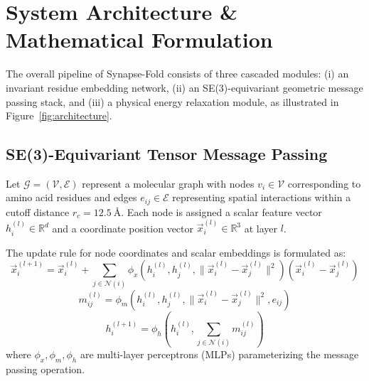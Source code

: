 \documentclass[10pt,a4paper]{scrartcl}
\begin{document}
\section{System Architecture \& Mathematical Formulation}

The overall pipeline of Synapse-Fold consists of three cascaded modules: (i) an invariant residue embedding network, (ii) an SE(3)-equivariant geometric message passing stack, and (iii) a physical energy relaxation module, as illustrated in Figure~\ref{fig:architecture}.


\subsection{SE(3)-Equivariant Tensor Message Passing}

Let $\mathcal{G} = (\mathcal{V}, \mathcal{E})$ represent a molecular graph with nodes $v_i \in \mathcal{V}$ corresponding to amino acid residues and edges $e_{ij} \in \mathcal{E}$ representing spatial interactions within a cutoff distance $r_c = 12.5~\text{\AA}$. Each node is assigned a scalar feature vector $h_i^{(l)} \in \mathbb{R}^d$ and a coordinate position vector $\vec{x}_i^{(l)} \in \mathbb{R}^3$ at layer $l$.

The update rule for node coordinates and scalar embeddings is formulated as:
\begin{equation}
\vec{x}_i^{(l+1)} = \vec{x}_i^{(l)} + \sum_{j \in \mathcal{N}(i)} \phi_x \left( h_i^{(l)}, h_j^{(l)}, \|\vec{x}_i^{(l)} - \vec{x}_j^{(l)}\|^2 \right) \left( \vec{x}_i^{(l)} - \vec{x}_j^{(l)} \right)
\label{eq:coord_update}
\end{equation}
\begin{equation}
m_{ij}^{(l)} = \phi_m \left( h_i^{(l)}, h_j^{(l)}, \|\vec{x}_i^{(l)} - \vec{x}_j^{(l)}\|^2, e_{ij} \right)
\label{eq:message}
\end{equation}
\begin{equation}
h_i^{(l+1)} = \phi_h \left( h_i^{(l)}, \sum_{j \in \mathcal{N}(i)} m_{ij}^{(l)} \right)
\label{eq:feature_update}
\end{equation}
where $\phi_x, \phi_m, \phi_h$ are multi-layer perceptrons (MLPs) parameterizing the message passing operation.
\end{document}
